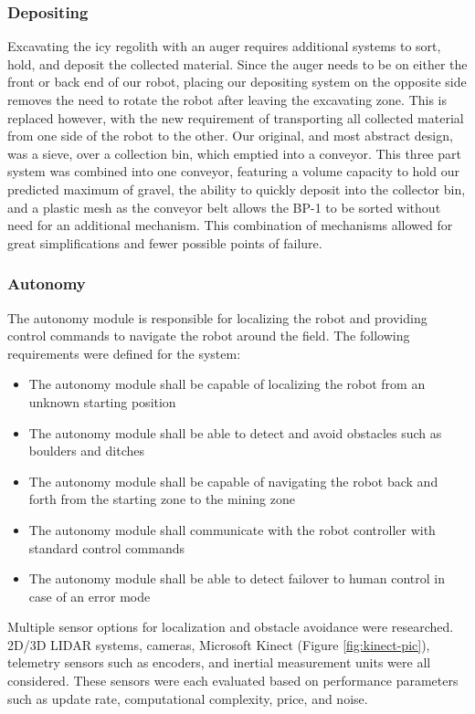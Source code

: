 \documentclass[class=article, crop=false]{standalone}
\begin{document}
	\subsubsection{Depositing}
	Excavating the icy regolith with an auger requires additional systems to sort, hold, and deposit the collected material.  Since the auger needs to be on either the front or back end of our robot, placing our depositing system on the opposite side removes the need to rotate the robot after leaving the excavating zone.  This is replaced however, with the new requirement of transporting all collected material from one side of the robot to the other.  Our original, and most abstract design, was a sieve, over a collection bin, which emptied into a conveyor.  This three part system was combined into one conveyor, featuring a volume capacity to hold our predicted maximum of gravel, the ability to quickly deposit into the collector bin, and a plastic mesh as the conveyor belt allows the BP-1 to be sorted without need for an additional mechanism.  This combination of mechanisms allowed for great simplifications and fewer possible points of failure. 
	
	
	\subsubsection{Autonomy}
	The autonomy module is responsible for localizing the robot and providing control commands to navigate the robot around the field. The following requirements were defined for the system:
	\begin{itemize}
	 \item The autonomy module shall be capable of localizing the robot from an unknown starting position
	 \item The autonomy module shall be able to detect and avoid obstacles such as boulders and ditches
	 \item The autonomy module shall be capable of navigating the robot back and forth from the starting zone to the mining zone
	 \item The autonomy module shall communicate with the robot controller with standard control commands
	 \item The autonomy module shall be able to detect failover to human control in case of an error mode
	\end{itemize}
	
	Multiple sensor options for localization and obstacle avoidance were researched. 2D/3D LIDAR systems, cameras, Microsoft Kinect (Figure \ref{fig:kinect-pic}), telemetry sensors such as encoders, and inertial measurement units were all considered. These sensors were each evaluated based on performance parameters such as update rate, computational complexity, price, and noise.
	
\end{document}
